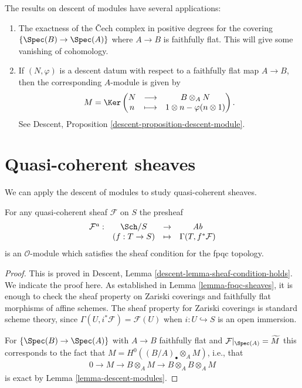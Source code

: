 \begin{remarks}
\label{remarks-theorem-modules-exactness}
The results on descent of modules have several applications:
\begin{enumerate}
\item The exactness of the {\v C}ech complex in positive degrees for
the covering $\{\Spec(B) \to \Spec(A)\}$ where $A \to B$ is
faithfully flat. This will give some vanishing of cohomology.
\item If $(N, \varphi)$ is a descent datum with respect to a faithfully
flat map $A \to B$, then the corresponding $A$-module is given by
$$
M = \Ker \left(
\begin{matrix}
N & \longrightarrow & B \otimes_A N \\
n & \longmapsto & 1 \otimes n - \varphi(n \otimes 1)
\end{matrix}
\right).
$$
See
Descent, Proposition \ref{descent-proposition-descent-module}.
\end{enumerate}
\end{remarks}




\section{Quasi-coherent sheaves}
\label{section-quasi-coherent}

\noindent
We can apply the descent of modules to study quasi-coherent sheaves.

\begin{proposition}
\label{proposition-quasi-coherent-sheaf-fpqc}
For any quasi-coherent sheaf $\mathcal{F}$ on $S$ the presheaf
$$
\begin{matrix}
\mathcal{F}^a : & \Sch/S & \to & \textit{Ab}\\
& (f: T \to S) & \mapsto & \Gamma(T, f^*\mathcal{F})
\end{matrix}
$$
is an $\mathcal{O}$-module which satisfies the sheaf condition for the
fpqc topology.
\end{proposition}

\begin{proof}
This is proved in
Descent, Lemma \ref{descent-lemma-sheaf-condition-holds}.
We indicate the proof here. As established in
Lemma \ref{lemma-fpqc-sheaves},
it is enough to check the sheaf property
on Zariski coverings and faithfully flat morphisms of affine schemes. The
sheaf property for Zariski coverings is standard scheme theory, since
$\Gamma(U, i^\ast \mathcal{F}) = \mathcal{F}(U)$ when
$i : U \hookrightarrow S$ is an open immersion.

\medskip\noindent
For $\left\{\Spec(B)\to \Spec(A)\right\}$ with $A\to B$ faithfully
flat and
$\mathcal{F}|_{\Spec(A)} = \widetilde{M}$
this corresponds to the fact that
$M = H^0\left((B/A)_\bullet \otimes_A M \right)$, i.e., that
\begin{align*}
0 \to M \to B \otimes_A M \to B \otimes_A B \otimes_A M
\end{align*}
is exact by
Lemma \ref{lemma-descent-modules}.
\end{proof}


